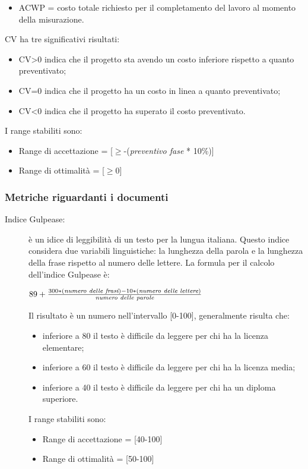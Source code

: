 \begin{description}
\begin{itemize}
        \item ACWP = costo totale richiesto per il completamento del lavoro al momento della misurazione.
      \end{itemize}
      CV ha tre significativi risultati:
      \begin{itemize}
        \item CV>0 indica che il progetto sta avendo un costo inferiore rispetto a quanto preventivato;
        \item CV=0 indica che il progetto ha un costo in linea a quanto preventivato;
        \item CV<0 indica che il progetto ha superato il costo preventivato.
      \end{itemize}
      I range stabiliti sono:
      \begin{itemize}
        \item Range di accettazione = [\(\geq\)-(\emph{preventivo fase} * 10\%)]
        \item Range di ottimalità = [\(\geq\)0]
      \end{itemize}
    \end{description}
    \subsubsection{Metriche riguardanti i documenti}
    \begin{description}
      \item[Indice Gulpease:] è un idice di leggibilità di un testo per la lungua italiana.
      Questo indice considera due variabili linguistiche: la lunghezza della parola e la lunghezza della frase rispetto al numero delle lettere.
      La formula per il calcolo dell'indice Gulpease è:
      \begin{center}
        \( 89+\frac{300 * (\emph{numero delle frasi}) - 10 * (\emph{numero delle lettere})}{\emph{numero delle parole}} \)
      \end{center}
      Il risultato è un numero nell'intervallo [0-100], generalmente risulta che:
      \begin{itemize}
        \item inferiore a 80 il testo è difficile da leggere per chi ha la licenza elementare;
        \item inferiore a 60 il testo è difficile da leggere per chi ha la licenza media;
        \item inferiore a 40 il testo è difficile da leggere per chi ha un diploma superiore.
      \end{itemize}
      I range stabiliti sono:
      \begin{itemize}
        \item Range di accettazione = [40-100]
        \item Range di ottimalità = [50-100]
      \end{itemize}
    \end{description}
